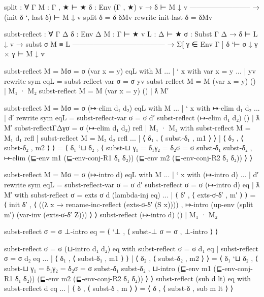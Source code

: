 \begin{fence}
\begin{code}
split : ∀ {Γ} {M : Γ , ★ ⊢ ★} {δ : Env (Γ , ★)} {v}
  → δ ⊢ M ↓ v
    --------------------------
  → (init δ `, last δ) ⊢ M ↓ v
split {δ = δ} δMv rewrite init-last δ = δMv

subst-reflect : ∀ {Γ Δ} {δ : Env Δ} {M : Γ ⊢ ★} {v} {L : Δ ⊢ ★} {σ : Subst Γ Δ}
  → δ ⊢ L ↓ v
  → subst σ M ≡ L
    ---------------------------------------
  → Σ[ γ ∈ Env Γ ] δ `⊢ σ ↓ γ  ×  γ ⊢ M ↓ v

subst-reflect {M = M}{σ = σ} (var {x = y}) eqL with M
... | ` x  with var {x = y}
...           | yv  rewrite sym eqL = subst-reflect-var {σ = σ} yv
subst-reflect {M = M} (var {x = y}) () | M₁ · M₂
subst-reflect {M = M} (var {x = y}) () | ƛ M′

subst-reflect {M = M}{σ = σ} (↦-elim d₁ d₂) eqL
         with M
...    | ` x with ↦-elim d₁ d₂
...    | d′ rewrite sym eqL = subst-reflect-var {σ = σ} d′
subst-reflect (↦-elim d₁ d₂) () | ƛ M′
subst-reflect{Γ}{Δ}{γ}{σ = σ} (↦-elim d₁ d₂)
   refl | M₁ · M₂
     with subst-reflect {M = M₁} d₁ refl | subst-reflect {M = M₂} d₂ refl
...     | ⟨ δ₁ , ⟨ subst-δ₁ , m1 ⟩ ⟩ | ⟨ δ₂ , ⟨ subst-δ₂ , m2 ⟩ ⟩ =
     ⟨ δ₁ `⊔ δ₂ , ⟨ subst-⊔ {γ₁ = δ₁}{γ₂ = δ₂}{σ = σ} subst-δ₁ subst-δ₂ ,
                    ↦-elim (⊑-env m1 (⊑-env-conj-R1 δ₁ δ₂))
                           (⊑-env m2 (⊑-env-conj-R2 δ₁ δ₂)) ⟩ ⟩

subst-reflect {M = M}{σ = σ} (↦-intro d) eqL with M
...    | ` x with (↦-intro d)
...             | d′ rewrite sym eqL = subst-reflect-var {σ = σ} d′
subst-reflect {σ = σ} (↦-intro d) eq | ƛ M′
      with subst-reflect {σ = exts σ} d (lambda-inj eq)
... | ⟨ δ′ , ⟨ exts-σ-δ′ , m′ ⟩ ⟩ =
    ⟨ init δ′ , ⟨ ((λ x → rename-inc-reflect (exts-σ-δ′ (S x)))) ,
             ↦-intro (up-env (split m′) (var-inv (exts-σ-δ′ Z))) ⟩ ⟩
subst-reflect (↦-intro d) () | M₁ · M₂

subst-reflect {σ = σ} ⊥-intro eq =
    ⟨ `⊥ , ⟨ subst-⊥ {σ = σ} , ⊥-intro ⟩ ⟩

subst-reflect {σ = σ} (⊔-intro d₁ d₂) eq
  with subst-reflect {σ = σ} d₁ eq | subst-reflect {σ = σ} d₂ eq
... | ⟨ δ₁ , ⟨ subst-δ₁ , m1 ⟩ ⟩ | ⟨ δ₂ , ⟨ subst-δ₂ , m2 ⟩ ⟩ =
     ⟨ δ₁ `⊔ δ₂ , ⟨ subst-⊔ {γ₁ = δ₁}{γ₂ = δ₂}{σ = σ} subst-δ₁ subst-δ₂ ,
                    ⊔-intro (⊑-env m1 (⊑-env-conj-R1 δ₁ δ₂))
                            (⊑-env m2 (⊑-env-conj-R2 δ₁ δ₂)) ⟩ ⟩
subst-reflect (sub d lt) eq
    with subst-reflect d eq
... | ⟨ δ , ⟨ subst-δ , m ⟩ ⟩ = ⟨ δ , ⟨ subst-δ , sub m lt ⟩ ⟩
\end{code}
\end{fence}

